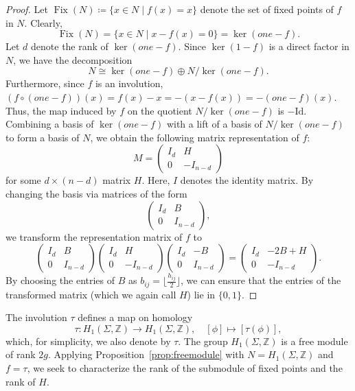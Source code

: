 \documentclass[11pt,a4paper]{article}
\theoremstyle{definition}
\newcommand{\Z}{\mathds{Z}}
\DeclareMathOperator{\fix}{\mathrm{Fix}}
\begin{document}
\begin{proof}
	Let $\fix(N) \coloneq \{x \in N \mid f(x) = x\}$ denote the set of fixed points of $f$ in $N$. Clearly,
	\[
	\fix(N) = \{x \in N \mid x - f(x) = 0\} = \ker(one-f).
	\]
	Let $d$ denote the rank of $\ker(one-f)$. Since $\ker(1 - f)$ is a direct factor in $N$, we have the decomposition
	\[
	N \cong \ker(one-f) \oplus N/ \ker(one-f).
	\]
	Furthermore, since $f$ is an involution, $(f \circ (one-f))(x) = f(x) - x = -(x - f(x)) = -(one-f)(x)$. Thus, the map induced by $f$ on the quotient $N/\ker(one-f)$ is $- \mathrm{Id}$. Combining a basis of $\ker(one-f)$ with a lift of a basis of $N/ \ker(one-f)$ to form a basis of $N$, we obtain the following matrix representation of $f$:
	\[
	M =
	\begin{pmatrix}
		I_d & H \\
		0 & -I_{n-d}
	\end{pmatrix}
	\]
	for some $d \times (n-d)$ matrix $H$. Here, $I$ denotes the identity matrix. By changing the basis via matrices of the form
	\[
	\begin{pmatrix}
		I_d & B \\
		0 & I_{n-d}
	\end{pmatrix},
	\]
	we transform the representation matrix of $f$ to
	\[
	\begin{pmatrix}
		I_d & B \\
		0 & I_{n-d}
	\end{pmatrix}
	\begin{pmatrix}
		I_d & H \\
		0 & -I_{n-d}
	\end{pmatrix}
	\begin{pmatrix}
		I_d & -B \\
		0 & I_{n-d}
	\end{pmatrix}
	=
	\begin{pmatrix}
		I_d & -2B + H \\
		0 & -I_{n-d}
	\end{pmatrix}.
	\]
	By choosing the entries of $B$ as $b_{ij} = \lfloor \frac{h_{ij}}{2} \rfloor$, we can ensure that the entries of the transformed matrix (which we again call $H$) lie in $\{0,1\}$.
\end{proof}

The involution $\tau$ defines a map on homology
\[
\tau : H_1(\Sigma,\Z) \to H_1(\Sigma,\Z), \quad [\phi] \mapsto [\tau(\phi)],
\]
which, for simplicity, we also denote by $\tau$. The group $H_1(\Sigma,\Z)$ is a free module of rank $2g$. Applying Proposition~\ref{prop:freemodule} with $N = H_1(\Sigma,\Z)$ and $f = \tau$, we seek to characterize the rank of the submodule of fixed points and the rank of $H$.
\end{document}
